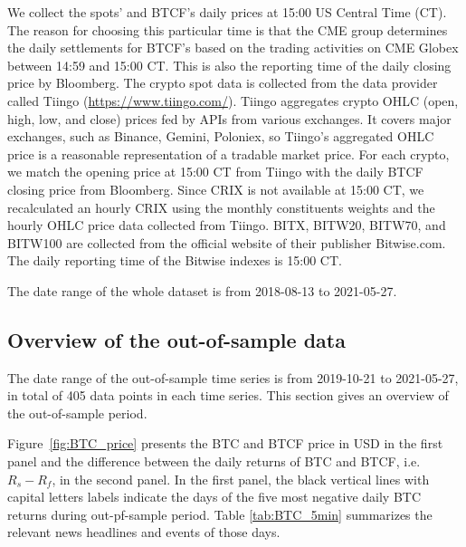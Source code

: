We collect the spots' and BTCF's daily prices at 15:00 US Central Time
(CT). The reason for choosing this particular time is that the CME
group determines the daily settlements for BTCF's based on the trading
activities on CME Globex between 14:59 and 15:00 CT. This is also the
reporting time of the daily closing price by Bloomberg. 
The crypto spot data is collected from the data provider called
Tiingo (\href{https://www.tiingo.com/}{https://www.tiingo.com/}).
Tiingo aggregates crypto OHLC (open, high, low, and close) prices fed
by APIs from various exchanges. It covers major exchanges, such as
Binance, Gemini, Poloniex, so Tiingo's aggregated OHLC price is a
reasonable representation of a tradable market price. 
For each crypto, we match the opening price at 15:00 CT from Tiingo
with the daily BTCF closing price from Bloomberg.
Since CRIX is not available at 15:00 CT, we recalculated an hourly
CRIX using the monthly constituents weights and the hourly OHLC price
data collected from Tiingo. 
BITX, BITW20, BITW70, and BITW100 are collected from the official
website of their publisher Bitwise.com. 
The daily reporting time of the Bitwise indexes is 15:00 CT.

The date range of the whole dataset is from 2018-08-13 to 2021-05-27. 


\subsection{Overview of the out-of-sample data}\label{subsec:oosdata}

The date range of the out-of-sample time series is from 2019-10-21 to
2021-05-27, in total of 405 data points in each time series. 
This section gives an overview of the out-of-sample period. 

Figure~\ref{fig:BTC_price} presents the BTC and BTCF price in USD in
the first panel and the difference between the daily returns of BTC and BTCF,
 i.e. $R_s - R_f$, in the second panel. 
In the first panel, the black vertical lines with capital letters
labels indicate the days of the five most negative daily BTC returns
during out-pf-sample period.
Table \ref{tab:BTC_5min} summarizes the relevant news headlines and
events of those days.  

